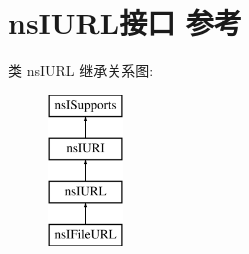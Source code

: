 \hypertarget{interfacens_i_u_r_l}{}\section{ns\+I\+U\+R\+L接口 参考}
\label{interfacens_i_u_r_l}
类 ns\+I\+U\+RL 继承关系图\+:\begin{figure}[H]
\begin{center}
\leavevmode
\includegraphics[height=4.000000cm]{interfacens_i_u_r_l}
\end{center}
\end{figure}
